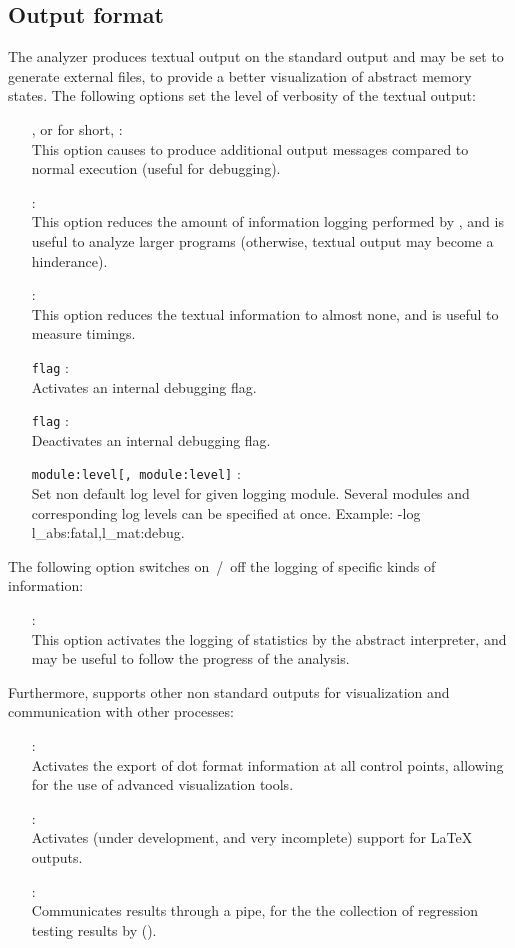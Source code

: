 \subsection{Output format}
\label{s:opt:out}
The \memcad analyzer produces textual output on the standard
output and may be set to generate external files, to provide a better
visualization of abstract memory states.
The following options set the level of verbosity of the textual output:
\begin{itemize}
\item[\doption{-verbose}, or for short, \doption{-v}]: \\
  This option causes \sanalyze to produce additional output
  messages compared to normal execution (useful for debugging).
\item[\doption{-silent}]: \\
  This option reduces the amount of information logging performed
  by \sanalyze, and is useful to analyze larger programs
  (otherwise, textual output may become a hinderance).
\item[\doption{-very-silent}]: \\
  This option reduces the textual information to almost none, and
  is useful to measure timings.
\item[\doption{-set-on} \texttt{flag}] \optdev: \\
  Activates an internal debugging flag.
\item[\doption{-set-off} \texttt{flag}] \optdev: \\
  Deactivates an internal debugging flag.
\item[\doption{-log} \texttt{module:level[, module:level]}] \optdev: \\
  Set non default log level for given \memcad logging module.
  Several modules and corresponding log levels can be specified at once.
  Example: -log l\_abs:fatal,l\_mat:debug.
\end{itemize}
The following option switches on~/~off the logging of specific kinds
of information:
\begin{itemize}
\item[\doption{-stats}]: \\
  This option activates the logging of statistics by the abstract
  interpreter, and may be useful to follow the progress of the analysis.
\end{itemize}
Furthermore, \memcad supports other non standard outputs for visualization
and communication with other processes:
\begin{itemize}
\item[\doption{-dot-all}] \optadv: \\
  Activates the export of dot format information at all control points,
  allowing for the use of advanced visualization tools.
\item[\doption{-latex}] \optdev: \\
  Activates (under development, and very incomplete) support for LaTeX
  outputs.
\item[\doption{-pipe}] \optdev: \\
  Communicates results through a pipe, for the the collection of regression
  testing results by \sbatch ().
\end{itemize}

